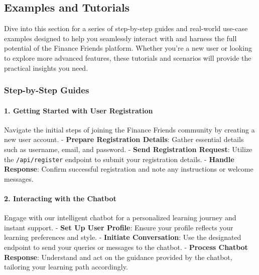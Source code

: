 \hypertarget{examples-and-tutorials}{%
\subsection{Examples and Tutorials}\label{examples-and-tutorials}}

Dive into this section for a series of step-by-step guides and
real-world use-case examples designed to help you seamlessly interact
with and harness the full potential of the Finance Friends platform.
Whether you're a new user or looking to explore more advanced features,
these tutorials and scenarios will provide the practical insights you
need.

\hypertarget{step-by-step-guides}{%
\subsubsection{Step-by-Step Guides}\label{step-by-step-guides}}

\hypertarget{getting-started-with-user-registration}{%
\paragraph{1. Getting Started with User
Registration}\label{getting-started-with-user-registration}}

Navigate the initial steps of joining the Finance Friends community by
creating a new user account. - \textbf{Prepare Registration Details}:
Gather essential details such as username, email, and password. -
\textbf{Send Registration Request}: Utilize the \texttt{/api/register}
endpoint to submit your registration details. - \textbf{Handle
Response}: Confirm successful registration and note any instructions or
welcome messages.

\hypertarget{interacting-with-the-chatbot}{%
\paragraph{2. Interacting with the
Chatbot}\label{interacting-with-the-chatbot}}

Engage with our intelligent chatbot for a personalized learning journey
and instant support. - \textbf{Set Up User Profile}: Ensure your profile
reflects your learning preferences and style. - \textbf{Initiate
Conversation}: Use the designated endpoint to send your queries or
messages to the chatbot. - \textbf{Process Chatbot Response}: Understand
and act on the guidance provided by the chatbot, tailoring your learning
path accordingly.

